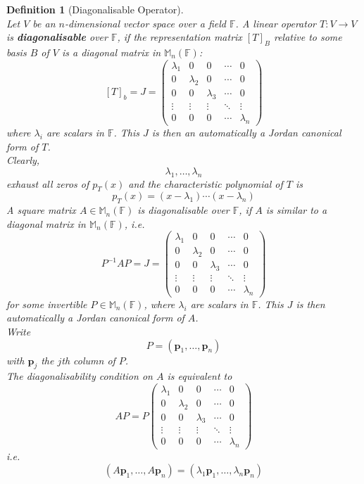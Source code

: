 \documentclass[12pt]{article}
\newtheorem{definition}{Definition}[section]
\theoremstyle{definition}
\begin{document}
\begin{definition}[Diagonalisable Operator]
\hfill\\\normalfont Let $V$ be an $n$-dimensional vector space over a field $\mathbb{F}$. A linear operator $T:V\to V$ is \textbf{diagonalisable} over $\mathbb{F}$, if the representation matrix $[T]_B$ relative to some basis $B$ of $V$ is a diagonal matrix in $\mathbb{M}_n(\mathbb{F})$:
\[
[T]_b=J=\begin{pmatrix}
\lambda_1&0&0&\cdots&0\\
0&\lambda_2&0&\cdots&0\\
0&0&\lambda_3&\cdots&0\\
\vdots&\vdots&\vdots&\ddots&\vdots\\
0&0&0&\cdots&\lambda_n
\end{pmatrix}
\]
where $\lambda_i$ are scalars in $\mathbb{F}$. This $J$ is then an automatically a Jordan canonical form of $T$.\\
Clearly,
\[
\lambda_1,\ldots,\lambda_n
\]
exhaust all zeros of $p_T(x)$ and the characteristic polynomial of $T$ is
\[
p_T(x)=(x-\lambda_1)\cdots (x-\lambda_n)
\]
A square matrix $A\in\mathbb{M}_n(\mathbb{F})$ is diagonalisable over $\mathbb{F}$,  if $A$ is similar to a diagonal matrix in $\mathbb{M}_n(\mathbb{F})$, i.e.
\[
P^{-1}AP=J=\begin{pmatrix}
\lambda_1&0&0&\cdots&0\\
0&\lambda_2&0&\cdots&0\\
0&0&\lambda_3&\cdots&0\\
\vdots&\vdots&\vdots&\ddots&\vdots\\
0&0&0&\cdots&\lambda_n
\end{pmatrix}
\]
for some invertible $P\in\mathbb{M}_n(\mathbb{F})$, where $\lambda_i$ are scalars in $\mathbb{F}$. This $J$ is then automatically a Jordan canonical form of $A$.\\
Write 
\[
P=(\mathbf{p}_1,\ldots,\mathbf{p}_n)
\]
with $\mathbf{p}_j$ the $j$th column of $P$.\\
The diagonalisability condition on $A$ is equivalent to
\[
AP=P\begin{pmatrix}
\lambda_1&0&0&\cdots&0\\
0&\lambda_2&0&\cdots&0\\
0&0&\lambda_3&\cdots&0\\
\vdots&\vdots&\vdots&\ddots&\vdots\\
0&0&0&\cdots&\lambda_n
\end{pmatrix}
\]
i.e.
\[
(A\mathbf{p}_1,\ldots,A\mathbf{p}_n)=(\lambda_1\mathbf{p}_1,\ldots,\lambda_n\mathbf{p}_n)
\]
\end{definition}
\end{document}
